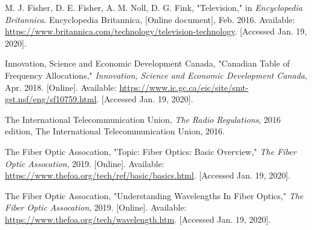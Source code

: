 \documentclass[12pt]{article}
\begin{document}
\begin{thebibliography}{10}
    M. J. Fisher, D. E. Fisher, A. M. Noll, D. G. Fink, "Television," in \textit{Encyclopedia Britannica}. Encyclopedia Britannica, [Online document], Feb. 2016. Available: \url{https://www.britannica.com/technology/television-technology}. [Accessed Jan. 19, 2020]. 

    Innovation, Science and Economic Development Canada, "Canadian Table of Frequency Allocations," \textit{Innovation, Science and Economic Development Canada}, Apr. 2018. [Online]. Available: \url{https://www.ic.gc.ca/eic/site/smt-gst.nsf/eng/sf10759.html}. [Accessed Jan. 19, 2020].

    The International Telecommunication Union, \textit{The Radio Regulations}, 2016 edition, The International Telecommunication Union, 2016.
    
    The Fiber Optic Assocation, "Topic: Fiber Optics: Basic Overview," \textit{The Fiber Optic Assocation}, 2019. [Online]. Available: \url{https://www.thefoa.org/tech/ref/basic/basics.html}. [Accessed Jan. 19, 2020].

    The Fiber Optic Assocation, "Understanding Wavelengths In Fiber Optics," \textit{The Fiber Optic Assocation}, 2019. [Online]. Available: \url{https://www.thefoa.org/tech/wavelength.htm}. [Accessed Jan. 19, 2020].
\end{thebibliography}
\end{document}
